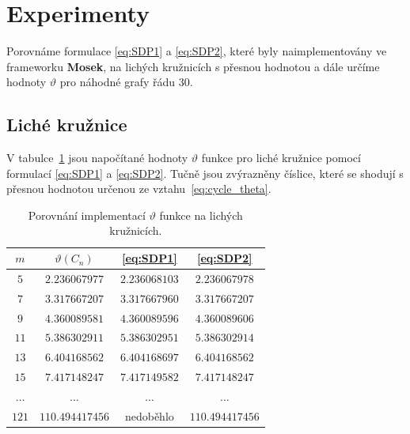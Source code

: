 \section{Experimenty}

Porovnáme formulace \ref{eq:SDP1} a \ref{eq:SDP2}, které byly naimplementovány ve frameworku \textbf{Mosek}, na lichých kružnicích s přesnou hodnotou a dále určíme hodnoty $\vartheta$ pro náhodné grafy řádu $30$.

\subsection{Liché kružnice}

V tabulce~\ref{tab:cycles_theta} jsou napočítané hodnoty $\vartheta$ funkce pro liché kružnice pomocí formulací \ref{eq:SDP1} a \ref{eq:SDP2}. Tučně jsou zvýrazněny číslice, které se shodují s přesnou hodnotou určenou ze vztahu~\ref{eq:cycle_theta}.

\begin{table}[h!]
    \begin{center}
        \begin{tabular}{ c | c c c }
        $m$     & $\vartheta(C_n)$ & \ref{eq:SDP1}          & \ref{eq:SDP2} \\
        \hline
        $5$     & $2.236067977$    & $\mathbf{2.23606}8103$ & $\mathbf{2.23606797}8$ \\
        $7$     & $3.317667207$    & $\mathbf{3.317667}960$ & $\mathbf{3.317667207}$ \\
        $9$     & $4.360089581$    & $\mathbf{4.3600895}96$ & $\mathbf{4.360089}606$ \\
        $11$    & $5.386302911$    & $\mathbf{5.3863029}51$ & $\mathbf{5.38630291}4$ \\
        $13$    & $6.404168562$    & $\mathbf{6.404168}697$ & $\mathbf{6.404168562}$ \\
        $15$    & $7.417148247$    & $\mathbf{7.41714}9582$ & $\mathbf{7.417148247}$ \\
        $\dots$ & $\dots$          & $\dots$                & $\dots$ \\
        $121$   & $110.494417456$  & nedoběhlo              & $\mathbf{110.494417456}$ \\
        \end{tabular}
    \end{center}
    \caption{Porovnání implementací $\vartheta$ funkce na lichých kružnicích.}
    \label{tab:cycles_theta}
\end{table}

